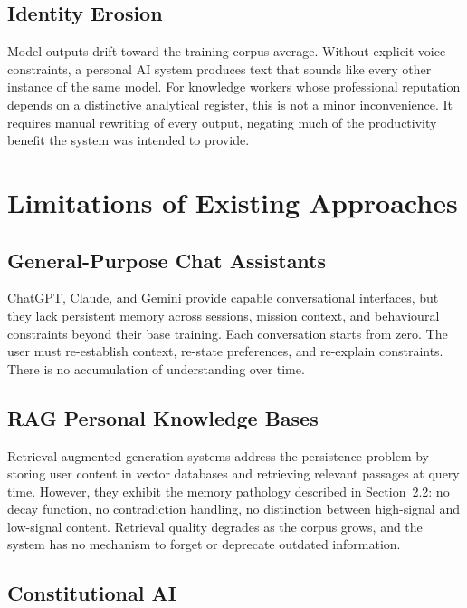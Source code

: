 \documentclass[11pt,a4paper]{article}
\begin{document}
\subsection{Identity Erosion}

Model outputs drift toward the training-corpus average. Without explicit voice constraints, a personal AI system produces text that sounds like every other instance of the same model. For knowledge workers whose professional reputation depends on a distinctive analytical register, this is not a minor inconvenience. It requires manual rewriting of every output, negating much of the productivity benefit the system was intended to provide.

\section{Limitations of Existing Approaches}

\subsection{General-Purpose Chat Assistants}

ChatGPT, Claude, and Gemini provide capable conversational interfaces, but they lack persistent memory across sessions, mission context, and behavioural constraints beyond their base training. Each conversation starts from zero. The user must re-establish context, re-state preferences, and re-explain constraints. There is no accumulation of understanding over time.

\subsection{RAG Personal Knowledge Bases}

Retrieval-augmented generation systems \citep{lewis2020rag} address the persistence problem by storing user content in vector databases and retrieving relevant passages at query time. However, they exhibit the memory pathology described in Section~2.2: no decay function, no contradiction handling, no distinction between high-signal and low-signal content. Retrieval quality degrades as the corpus grows, and the system has no mechanism to forget or deprecate outdated information.

\subsection{Constitutional AI}
\end{document}
